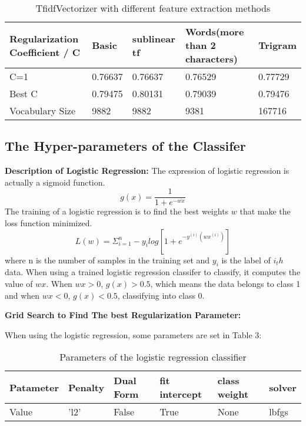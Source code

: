 \documentclass[letterpaper, 10 pt, conference]{ieeeconf}  %
\begin{document}
\begin{table}  
	\caption{TfidfVectorizer with different feature extraction methods}  
	\begin{center}  
		\begin{tabu} to 1\textwidth{X[3,c]|X[1,b]|X[2,l]|X[3,c]|X[2,m]}  
			\hline  
			Regularization Coefficient / C  &Basic             &sublinear tf      &Words(more than 2 characters)         &Trigram\\  
			\hline  
			C=1    &0.76637       &0.76637           &0.76529    &0.77729      \\  
			Best C    &0.79475      &0.80131           &0.79039    &0.79476     \\  
			Vocabulary Size    &9882      &9882           &9381         &167716\\  
			
			\hline  
		\end{tabu}  
	\end{center}  
\end{table} 

\subsection{The Hyper-parameters of the Classifer}
\textbf{Description of Logistic Regression:}
The expression of logistic regression is actually a sigmoid function.
$$
g(x)=\frac{1}{1+e^{-wx}}
$$
The training of a logistic regression is to find the best weights $w$ that make the loss function minimized.
$$
L(w)=\Sigma_{i=1}^n-y_ilog[1+e^{-y^{(i)}(wx^{(i)})}]
$$
where n is the number of samples in the training set and $y_i$ is the label of $i_th$ data. When using a trained logistic regression classifer to classify, it computes the value of $wx$. When $wx>0$, $g(x)>0.5$, which means the data belongs to class 1 and when $wx<0$, $g(x)<0.5$, classifying into class 0. 

\textbf{Grid Search to Find The best Regularization Parameter: }

When using the logistic regression, some parameters are set in Table 3:

\begin{table}[h]
	\caption{Parameters of the logistic regression classifier}  
	\begin{tabular*}{12cm}{llllll}  
		\hline  
		Patameter & Penalty  & Dual Form &fit intercept  &class weight &solver\\  
		\hline  
		Value  & 'l2' & False &True &None &lbfgs\\    
		\hline  
	\end{tabular*}  
\end{table}   
\end{document}
